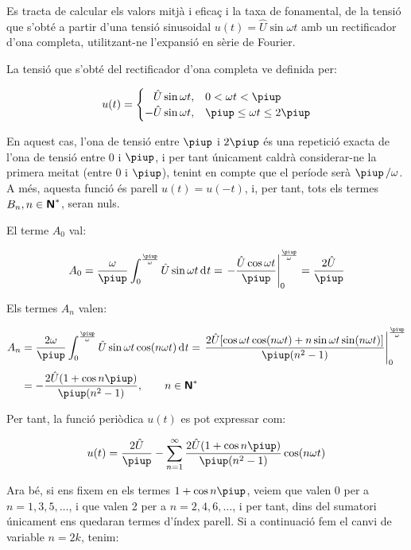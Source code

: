 	
\begin{exemple}[\ValorMitjaEfTaxaFon{}]
	\addcontentsxms{\ValorMitjaEfTaxaFon}
    Es tracta de calcular els valors mitjà i eficaç i la taxa de
    fonamental, de la tensió que s'obté a partir d'una tensió
    sinusoidal $u(t) = \hat{U} \sin\omega t$ amb un rectificador d'ona
    completa, utilitzant-ne l'expansió en sèrie de Fourier.

    La tensió que s'obté del rectificador d'ona completa ve definida
    per:

    \[
    u(t) = \begin{cases} \phantom{-}\hat{U} \sin\omega t, & 0 < \omega t < \piup\\
           -\hat{U} \sin\omega t, & \piup \leq \omega t \leq 2\piup \end{cases}
    \]

    En aquest cas, l'ona de tensió entre $\piup$ i $2\piup$ és una repetició
    exacta de l'ona de tensió entre 0 i $\piup$, i per tant únicament
    caldrà considerar-ne la primera meitat (entre 0 i $\piup$), tenint en
    compte que el període serà $\piup\,/\omega$. A més, aquesta funció és
    parell $u(t) = u(-t)$, i, per tant, tots els termes
    $B_n, n \in {\ensuremath{\boldsymbol{\mathsf{N}}}}^*$, seran nuls.

    El terme $A_0$ val:

    \[
    A_0 = \frac{\omega}{\piup} \int_0^{\frac{\piup}{\omega}} \hat{U} \sin
    \omega t \diff t = \left. -\frac{\hat{U} \cos \omega t}{\piup}
    \right|_0^{\frac{\piup}{\omega}} = \frac{2\hat{U}}{\piup}
    \]

    Els termes $A_n$ valen:

    \[
    \begin{split}
    A_n &= \frac{2 \omega}{\piup} \int_0^{\frac{\piup}{\omega}} \hat{U} \sin
    \omega t \cos(n \omega t)\diff t = \left. \frac{2 \hat{U}[ \cos
    \omega t \cos (n \omega t) + n \sin \omega t \sin(n \omega
    t)]}{\piup(n^2-1)} \right|_0^{\frac{\piup}{\omega}}\\[0.5ex]
    &= -\frac{2\hat{U}(1+\cos n \piup)}{\piup(n^2-1)},
    \qquad n \in \mathsfb{N}^*
    \end{split}
    \]

    Per tant, la funció periòdica $u(t)$ es pot expressar com:

    \[
        u(t) = \frac{2\hat{U}}{\piup} - \sum_{n=1}^\infty
         \frac{2\hat{U}(1+\cos n \piup)}{\piup(n^2-1)} \cos(n \omega t)
    \]

    Ara bé, si ens fixem en els termes $1+\cos n \piup$, veiem que valen 0
    per a $n=1,3,5,\ldots$, i que valen 2 per a $n=2,4,6,\ldots$, i per tant, dins
    del sumatori únicament ens quedaran termes d'índex parell. Si a
    continuació fem el canvi de variable $n=2k$, tenim:


\end{exemple}

